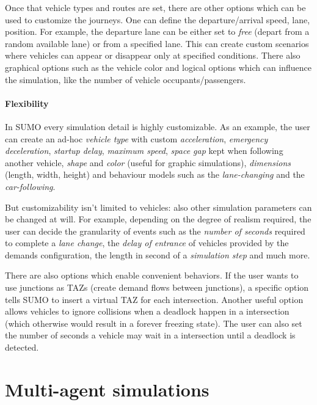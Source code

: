 Once that vehicle types and routes are set, there are other options which can be used to customize the journeys. One can define the departure/arrival speed, lane, position. For example, the departure lane can be either set to \textit{free} (depart from a random available lane) or from a specified lane. This can create custom scenarios where vehicles can appear or disappear only at specified conditions. There also graphical options such as the vehicle color and logical options which can influence the simulation, like the number of vehicle occupants/passengers.

\paragraph{Flexibility}

In SUMO every simulation detail is highly customizable.
As an example, the user can create an ad-hoc \textit{vehicle type} with custom \textit{acceleration}, \textit{emergency deceleration}, \textit{startup delay}, \textit{maximum speed}, \textit{space gap} kept when following another vehicle, \textit{shape} and \textit{color} (useful for graphic simulations), \textit{dimensions} (length, width, height) and behaviour models such as the \textit{lane-changing} and the \textit{car-following}.

But customizability isn't limited to vehicles: also other simulation parameters can be changed at will. For example, depending on the degree of realism required, the user can decide the granularity of events such as the \textit{number of seconds} required to complete a \textit{lane change}, the \textit{delay of entrance} of vehicles provided by the demands configuration, the length in second of a \textit{simulation step} and much more.

There are also options which enable convenient behaviors. If the user wants to use junctions as TAZs (create demand flows between junctions), a specific option tells SUMO to insert a virtual TAZ for each intersection. Another useful option allows vehicles to ignore collisions when a deadlock happen in a intersection (which otherwise would result in a forever freezing state). The user can also set the number of seconds a vehicle may wait in a intersection until a deadlock is detected.

\section{Multi-agent simulations}

